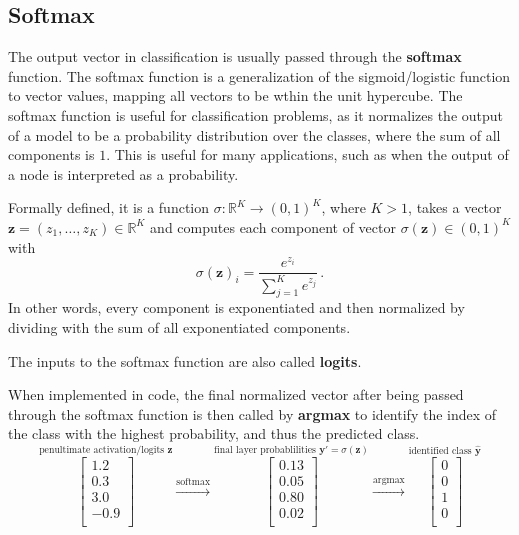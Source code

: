 \documentclass[12pt]{report}
\theoremstyle{definition}
\theoremstyle{remark}
\begin{document}
\subsection{Softmax}
The output vector in classification is usually passed through the \textbf{softmax} function. The softmax function is a generalization of the sigmoid/logistic function to vector values, mapping all vectors to be wthin the unit hypercube. The softmax function is useful for classification problems, as it normalizes the output of a model to be a probability distribution over the classes, where the sum of all components is $1$. This is useful for many applications, such as when the output of a node is interpreted as a probability.

Formally defined, it is a function $\sigma\colon \mathbb{R}^K \to (0, 1)^K$, where $K > 1$, takes a vector $\mathbf{z} = (z_1, \dotsc, z_K) \in \mathbb{R}^K$ and computes each component of vector $\sigma(\mathbf{z}) \in (0, 1)^K$ with
\begin{equation}
\sigma(\mathbf{z})_i = \frac{e^{z_i}}{\sum_{j=1}^K e^{z_j}}\,.
\end{equation}
In other words, every component is exponentiated and then normalized by dividing with the sum of all exponentiated components.

The inputs to the softmax function are also called \textbf{logits}.

When implemented in code, the final normalized vector after being passed through the softmax function is then called by \textbf{argmax} to identify the index of the class with the highest probability, and thus the predicted class.
\begin{equation}
    \stackrel{\mbox{penultimate activation/logits $\mathbf{z}$}}{\begin{bmatrix}
        1.2 \\
        0.3 \\
        3.0 \\
        -0.9 \\
    \end{bmatrix}}
    \xrightarrow{\text{softmax}}
    \stackrel{\mbox{final layer probablilities $\mathbf{y'} = \sigma({\mathbf{z}})$}}{\begin{bmatrix}
        0.13 \\
        0.05 \\
        0.80 \\
        0.02 \\
    \end{bmatrix}}
    \xrightarrow{\text{argmax}}
    \stackrel{\mbox{identified class $\mathbf{\hat{y}}$}}{\begin{bmatrix}
        0 \\
        0 \\
        1 \\
        0 \\
    \end{bmatrix}}
\end{equation}
\end{document}
